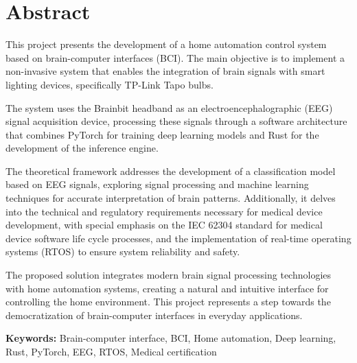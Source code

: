 \chapter*{Abstract}

This project presents the development of a home automation control system based on brain-computer interfaces (BCI). The main objective is to implement a non-invasive system that enables the integration of brain signals with smart lighting devices, specifically TP-Link Tapo bulbs.

The system uses the Brainbit headband as an electroencephalographic (EEG) signal acquisition device, processing these signals through a software architecture that combines PyTorch for training deep learning models and Rust for the development of the inference engine.

The theoretical framework addresses the development of a classification model based on EEG signals, exploring signal processing and machine learning techniques for accurate interpretation of brain patterns. Additionally, it delves into the technical and regulatory requirements necessary for medical device development, with special emphasis on the IEC 62304 standard for medical device software life cycle processes, and the implementation of real-time operating systems (RTOS) to ensure system reliability and safety.

The proposed solution integrates modern brain signal processing technologies with home automation systems, creating a natural and intuitive interface for controlling the home environment. This project represents a step towards the democratization of brain-computer interfaces in everyday applications.

\vspace{0.5cm}
\noindent\textbf{Keywords:} Brain-computer interface, BCI, Home automation, Deep learning, Rust, PyTorch, EEG, RTOS, Medical certification